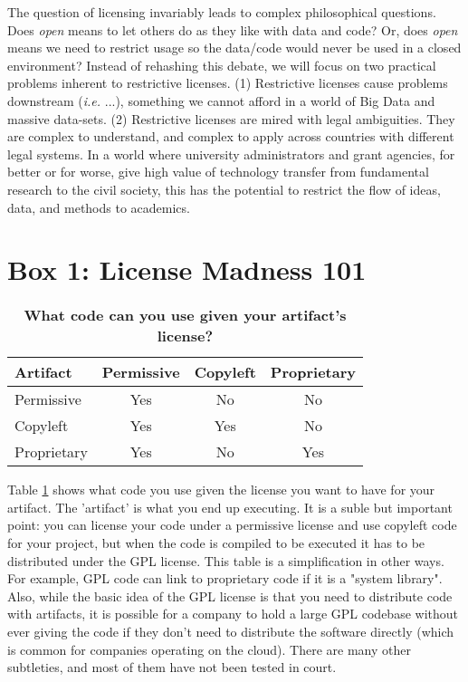 \documentclass[letterpaper]{article}
\begin{document}
The question of licensing invariably leads to complex philosophical questions.
Does \emph{open} means to let others do as they like with data and code? Or,
does \emph{open} means we need to restrict usage so the data/code would never
be used in a closed environment? Instead of rehashing this debate, we will
focus on two practical problems inherent to restrictive licenses. (1) Restrictive
licenses cause problems downstream (\emph{i.e.} ...), something we cannot afford in a world of
Big Data and massive data-sets. (2) Restrictive licenses are mired with legal
ambiguities. They are complex to understand, and complex to apply across
countries with different legal systems. In a world where university administrators and grant agencies, for better
or for worse, give high value of technology transfer from fundamental research to
the civil society, this has the potential to restrict the flow of ideas, data, and methods
to academics.


\section{Box 1: License Madness 101}

\begin{table}
  \centering
  \caption{\bf{What code can you use given your artifact's license?}}
  \begin{tabular}{|l|ccc|}
  \hline
  Artifact              & Permissive & Copyleft & Proprietary \\
  \hline
  Permissive            & Yes        & No       & No          \\
  Copyleft              & Yes        & Yes      & No          \\
  Proprietary           & Yes        & No       & Yes         \\
  \hline
  \end{tabular}
  \label{table:codelicenses}
\end{table}

Table \ref{table:codelicenses} shows what code you use given the license you
want to have for your artifact. The 'artifact' is what you end up executing.
It is a suble but important point: you can license your code under a permissive
license and use copyleft code for your project, but when the code is compiled
to be executed it has to be distributed under the GPL license. This table is a
simplification in other ways. For example, GPL code can link to proprietary
code if it is a "system library". Also, while the basic idea of the GPL license is
that you need to distribute code with artifacts, it is possible for a company
to hold a large GPL codebase without ever giving the code if they don't need to
distribute the software directly (which is common for companies operating on
the cloud). There are many other subtleties, and most of them have not been
tested in court.
\end{document}
